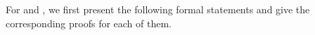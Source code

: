 For  and , 
we first present the following formal statements and give the corresponding proofs for each of them.

